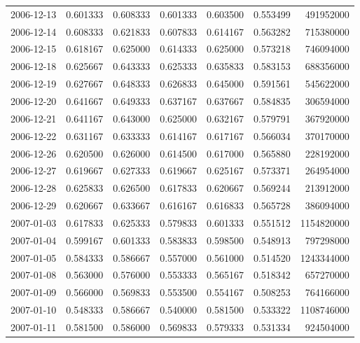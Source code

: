 \begin{tabular}{lrrrrrr}
2006-12-13 &    0.601333 &    0.608333 &    0.601333 &    0.603500 &    0.553499 &   491952000 \\
2006-12-14 &    0.608333 &    0.621833 &    0.607833 &    0.614167 &    0.563282 &   715380000 \\
2006-12-15 &    0.618167 &    0.625000 &    0.614333 &    0.625000 &    0.573218 &   746094000 \\
2006-12-18 &    0.625667 &    0.643333 &    0.625333 &    0.635833 &    0.583153 &   688356000 \\
2006-12-19 &    0.627667 &    0.648333 &    0.626833 &    0.645000 &    0.591561 &   545622000 \\
2006-12-20 &    0.641667 &    0.649333 &    0.637167 &    0.637667 &    0.584835 &   306594000 \\
2006-12-21 &    0.641167 &    0.643000 &    0.625000 &    0.632167 &    0.579791 &   367920000 \\
2006-12-22 &    0.631167 &    0.633333 &    0.614167 &    0.617167 &    0.566034 &   370170000 \\
2006-12-26 &    0.620500 &    0.626000 &    0.614500 &    0.617000 &    0.565880 &   228192000 \\
2006-12-27 &    0.619667 &    0.627333 &    0.619667 &    0.625167 &    0.573371 &   264954000 \\
2006-12-28 &    0.625833 &    0.626500 &    0.617833 &    0.620667 &    0.569244 &   213912000 \\
2006-12-29 &    0.620667 &    0.633667 &    0.616167 &    0.616833 &    0.565728 &   386094000 \\
2007-01-03 &    0.617833 &    0.625333 &    0.579833 &    0.601333 &    0.551512 &  1154820000 \\
2007-01-04 &    0.599167 &    0.601333 &    0.583833 &    0.598500 &    0.548913 &   797298000 \\
2007-01-05 &    0.584333 &    0.586667 &    0.557000 &    0.561000 &    0.514520 &  1243344000 \\
2007-01-08 &    0.563000 &    0.576000 &    0.553333 &    0.565167 &    0.518342 &   657270000 \\
2007-01-09 &    0.566000 &    0.569833 &    0.553500 &    0.554167 &    0.508253 &   764166000 \\
2007-01-10 &    0.548333 &    0.586667 &    0.540000 &    0.581500 &    0.533322 &  1108746000 \\
2007-01-11 &    0.581500 &    0.586000 &    0.569833 &    0.579333 &    0.531334 &   924504000 \\

\end{tabular}
